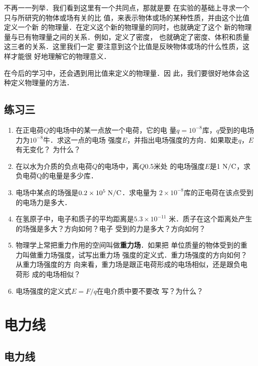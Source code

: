 不再一一列举．我们看到这里有一个共同点，那就是要
在实验的基础上寻求一个只与所研究的物体或场有关的比
值，来表示物体或场的某种性质，并由这个比值定义一个新
的物理量．在定义这个新的物理量的同时，也就确定了这个
新的物理量与已有物理量之间的关系．例如，定义了密度，
也就确定了密度、体积和质量这三者的关系．这里我们一定
要注意到这个比值是反映物体或场的什么性质，这样才能很
好地理解它的物理意义．

在今后的学习中，还会遇到用比值来定义的物理量．因
此，我们要很好地体会这种定义物理量的方法．

\subsection*{练习三}

\begin{enumerate}
    \item 在正电荷$Q$的电场中的某一点放一个电荷，它的电
    量$q=10^{-8}$库，$q$受到的电场力为$10^{-8}$牛．求这一点的电场
    强度$E$，并指出电场强度的方向．如果取走$q$，$E$有无变化？
    为什么？
    \item 在以水为介质的负点电荷$Q$的电场中，离$Q$0.5米处
    的电场强度$E$是1$\;\text{N}/\text{C}$，求负电荷Q的电量是多少库．
    \item 电场中某点的场强是$0.2\times10^5\;\text{N}/\text{C}$．求电量为
    $2\times10^{-8}$库的正电荷在该点受到的电场力是多大．
    \item 在氢原子中，电子和质子的平均距离是$5.3\times10^{-11}$
    米．质子在这个距离处产生的场强是多大？方向如何？电子
    受到的力是多大？方向如何？
    \item 物理学上常把重力作用的空间叫做\textbf{重力场}．如果把
    单位质量的物体受到的重力叫做重力场强度，试写出重力场
    强度的定义式．重力场强度的方向如何？从重力场强度的方
    向来看，重力场是跟正电荷形成的电场相似，还是跟负电荷形
成的电场相似？
\item 电场强度的定义式$E=F/q$在电介质中要不要改
写？为什么？
\end{enumerate}


\section{电力线}
\subsection{电力线}


